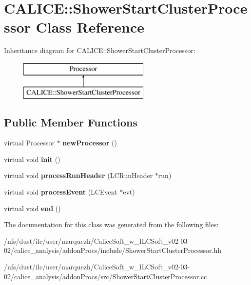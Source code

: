 \section{C\-A\-L\-I\-C\-E\-:\-:Shower\-Start\-Cluster\-Processor Class Reference}
\label{classCALICE_1_1ShowerStartClusterProcessor}
Inheritance diagram for C\-A\-L\-I\-C\-E\-:\-:Shower\-Start\-Cluster\-Processor\-:\begin{figure}[H]
\begin{center}
\leavevmode
\includegraphics[height=2.000000cm]{classCALICE_1_1ShowerStartClusterProcessor}
\end{center}
\end{figure}
\subsection*{Public Member Functions}
\begin{DoxyCompactItemize}
\item 
virtual Processor $\ast$ {\bfseries new\-Processor} ()\label{classCALICE_1_1ShowerStartClusterProcessor_a9b12a2d0ab6adbb8a53cbce140594591}

\item 
virtual void {\bfseries init} ()\label{classCALICE_1_1ShowerStartClusterProcessor_adf7a5d49de5ce05ddab35a2fdf619639}

\item 
virtual void {\bfseries process\-Run\-Header} (L\-C\-Run\-Header $\ast$run)\label{classCALICE_1_1ShowerStartClusterProcessor_a34a2a0630e0c6ae47f49c2f49c76ea08}

\item 
virtual void {\bfseries process\-Event} (L\-C\-Event $\ast$evt)\label{classCALICE_1_1ShowerStartClusterProcessor_a13772a5bcf8f8a57796ea314e605a21d}

\item 
virtual void {\bfseries end} ()\label{classCALICE_1_1ShowerStartClusterProcessor_ae5de75e169db59ebf3899fbd625c1431}

\end{DoxyCompactItemize}


The documentation for this class was generated from the following files\-:\begin{DoxyCompactItemize}
\item 
/nfs/dust/ilc/user/marquezh/\-Calice\-Soft\-\_\-w\-\_\-\-I\-L\-C\-Soft\-\_\-v02-\/03-\/02/calice\-\_\-analysis/addon\-Procs/include/Shower\-Start\-Cluster\-Processor.\-hh\item 
/nfs/dust/ilc/user/marquezh/\-Calice\-Soft\-\_\-w\-\_\-\-I\-L\-C\-Soft\-\_\-v02-\/03-\/02/calice\-\_\-analysis/addon\-Procs/src/Shower\-Start\-Cluster\-Processor.\-cc\end{DoxyCompactItemize}
